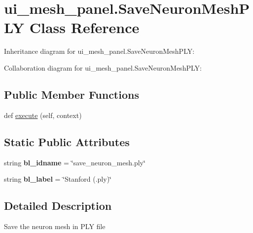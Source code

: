 \hypertarget{classui__mesh__panel_1_1SaveNeuronMeshPLY}{}\section{ui\+\_\+mesh\+\_\+panel.\+Save\+Neuron\+Mesh\+P\+LY Class Reference}
\label{classui__mesh__panel_1_1SaveNeuronMeshPLY}


Inheritance diagram for ui\+\_\+mesh\+\_\+panel.\+Save\+Neuron\+Mesh\+P\+LY\+:


Collaboration diagram for ui\+\_\+mesh\+\_\+panel.\+Save\+Neuron\+Mesh\+P\+LY\+:
\subsection*{Public Member Functions}
\begin{DoxyCompactItemize}
\item 
def \hyperlink{classui__mesh__panel_1_1SaveNeuronMeshPLY_a12d5f5a6d9d9b298de50b46722a21525}{execute} (self, context)
\end{DoxyCompactItemize}
\subsection*{Static Public Attributes}
\begin{DoxyCompactItemize}
\item 
string {\bfseries bl\+\_\+idname} = \char`\"{}save\+\_\+neuron\+\_\+mesh.\+ply\char`\"{}\hypertarget{classui__mesh__panel_1_1SaveNeuronMeshPLY_a27b4633a417e1a3e8ca522eb82f522df}{}\label{classui__mesh__panel_1_1SaveNeuronMeshPLY_a27b4633a417e1a3e8ca522eb82f522df}

\item 
string {\bfseries bl\+\_\+label} = \char`\"{}Stanford (.ply)\char`\"{}\hypertarget{classui__mesh__panel_1_1SaveNeuronMeshPLY_aac4955504c0abbed9bb76b2d7761256d}{}\label{classui__mesh__panel_1_1SaveNeuronMeshPLY_aac4955504c0abbed9bb76b2d7761256d}

\end{DoxyCompactItemize}


\subsection{Detailed Description}
\begin{DoxyVerb}Save the neuron mesh in PLY file\end{DoxyVerb}
 

